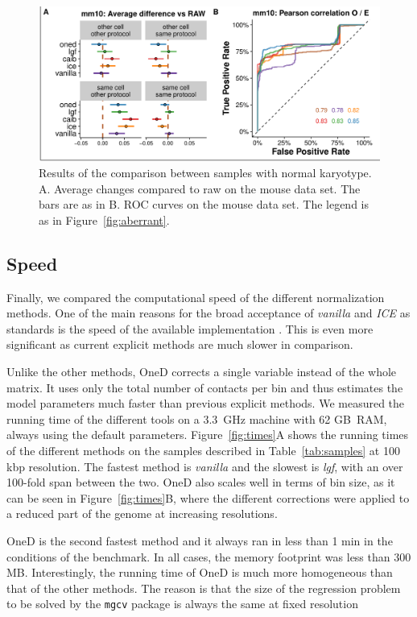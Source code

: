 \documentclass{bioinfo}
\begin{document}
\begin{figure}
\centerline{\includegraphics[width=.50\textwidth]{img/correlation_normal_figure4.pdf}}
\caption{
Results of the comparison between samples with normal karyotype.  A.
Average changes compared to raw on the mouse data set. The bars are as in
B. ROC curves on the mouse data set. The legend is as in
Figure~\ref{fig:aberrant}.}
\label{fig:normal}
\end{figure}



\subsection{Speed}

Finally, we compared the computational speed of the different
normalization methods. One of the main reasons for the broad acceptance of
\textit{vanilla} and \textit{ICE} as standards is the speed of the
available implementation \citep{imakaev2012iterative}. This is even more
significant as current explicit methods \citep{servant2012hitc} are much
slower in comparison.

Unlike the other methods, OneD corrects a single variable instead of the
whole matrix. It uses only the total number of contacts per bin and thus
estimates the model parameters much faster than previous explicit methods.
We measured the running time of the different tools on a 3.3~GHz machine
with 62 GB~RAM, always using the default parameters. Figure~\ref{fig:times}A
shows the running times of the different methods on the samples described
in Table~\ref{tab:samples} at 100 kbp resolution. The fastest method is
\textit{vanilla} and the slowest is \textit{lgf}, with an over 100-fold
span between the two. OneD also scales well in terms of bin size, as it can
be seen in Figure~\ref{fig:times}B, where the different corrections were
applied to a reduced part of the genome at increasing resolutions.

OneD is the second fastest method and it always ran in less than 1 min in
the conditions of the benchmark. In all cases, the memory footprint was
less than 300 MB. Interestingly, the running time of OneD is much more
homogeneous than that of the other methods. The reason is that the size of
the regression problem to be solved by the \texttt{mgcv} package is always
the same at fixed resolution
\end{document}
